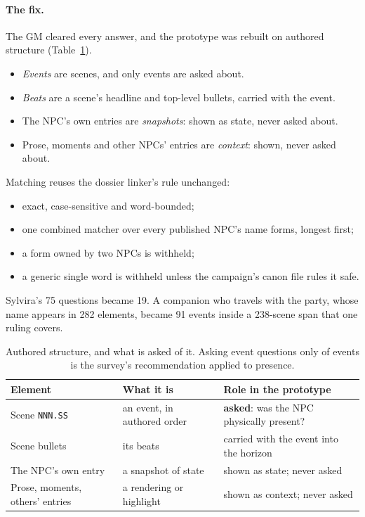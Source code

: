 \documentclass[11pt]{article}
\newcommand{\code}[1]{\texttt{#1}}
\begin{document}
\paragraph{The fix.}
The GM cleared every answer, and the prototype was rebuilt on authored structure
(Table~\ref{tab:elements}).
\begin{itemize}[nosep]
\item \emph{Events} are scenes, and only events are asked about.
\item \emph{Beats} are a scene's headline and top-level bullets, carried with the
event.
\item The NPC's own entries are \emph{snapshots}: shown as state, never asked about.
\item Prose, moments and other NPCs' entries are \emph{context}: shown, never asked
about.
\end{itemize}
Matching reuses the dossier linker's rule unchanged:
\begin{itemize}[nosep]
\item exact, case-sensitive and word-bounded;
\item one combined matcher over every published NPC's name forms, longest first;
\item a form owned by two NPCs is withheld;
\item a generic single word is withheld unless the campaign's canon file rules it safe.
\end{itemize}
Sylvira's 75 questions became 19. A companion who travels with the party, whose name
appears in 282 elements, became 91 events inside a 238-scene span that one ruling
covers.

\begin{table}[t]
\centering
\small
\begin{tabularx}{\linewidth}{@{}lXl@{}}
\toprule
Element & What it is & Role in the prototype \\
\midrule
Scene \code{NNN.SS} & an event, in authored order & \textbf{asked}: was the NPC physically present? \\
Scene bullets & its beats & carried with the event into the horizon \\
The NPC's own entry & a snapshot of state & shown as state; never asked \\
Prose, moments, others' entries & a rendering or highlight & shown as context; never asked \\
\bottomrule
\end{tabularx}
\caption{Authored structure, and what is asked of it. Asking event questions only of
events is the survey's recommendation applied to presence.}
\label{tab:elements}
\end{table}
\end{document}

